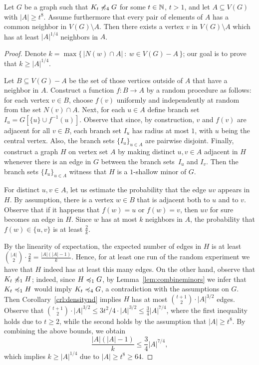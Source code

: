 \begin{lemma}\label{lem:diversity}
  Let $G$ be a graph such that $K_t\not\preccurlyeq_4G$ for some $t\in\mathbb{N}$,
  $t>1$, and let $A\subseteq V(G)$ with $|A|\geq t^{8}$.  Assume
  furthermore that every pair of elements of $A$ has a common neighbor
  in $V(G)\setminus A$.  Then there exists a vertex $v$ in
  $V(G)\setminus A$ which has at least $|A|^{1/4}$ neighbors in $A$.
\end{lemma}
\begin{proof}
  Denote $k=\max\{\,|N(w)\cap A|\ \colon\ w\in V(G)-A\,\}$; our goal
  is to prove that $k\geq |A|^{1/4}$.

  Let $B\subseteq V(G)-A$ be the set of those vertices outside of $A$
  that have a neighbor in $A$.  Construct a function $f\colon B\to A$
  by a random procedure as follows: for each vertex $v\in B$, choose
  $f(v)$ uniformly and independently at random from the set
  $N(v)\cap A$.  Next, for each $u\in A$ define branch set
  $I_u=G[\{u\}\cup f^{-1}(u)]$. Observe that since, by construction,
  $v$ and $f(v)$ are adjacent for all $v\in B$, each branch set $I_u$
  has radius at most $1$, with $u$ being the central vertex. Also, the
  branch sets $\{I_u\}_{u\in A}$ are pairwise disjoint.  Finally,
  construct a graph $H$ on vertex set $A$ by making distinct
  $u,v\in A$ adjacent in $H$ whenever there is an edge in $G$ between
  the branch sets~$I_u$ and $I_v$.  Then the branch sets
  $\{I_u\}_{u\in A}$ witness that $H$ is a $1$-shallow minor of $G$.

  For distinct $u,v\in A$, let us estimate the probability that the
  edge $uv$ appears in $H$.  By assumption, there is a vertex $w\in B$
  that is adjacent both to $u$ and to $v$. Observe that if it happens
  that $f(w)=u$ or $f(w)=v$, then $uv$ for sure becomes an edge in
  $H$.  Since $w$ has at most $k$ neighbors in $A$, the probability
  that $f(w)\in \{u,v\}$ is at least $\frac{2}{k}$.

  By the linearity of expectation, the expected number of edges in $H$
  is at least $\binom{|A|}{2}\cdot \frac{2}{k}=\frac{|A|(|A|-1)}{k}$.
  Hence, for at least one run of the random experiment we have that
  $H$ indeed has at least this many edges.  On the other hand, observe
  that $K_t\not\preccurlyeq_1 H$; indeed, since $H\preccurlyeq_1 G$, by
  Lemma~\ref{lem:combineminors} we infer that $K_t\preccurlyeq_1 H$ would
  imply $K_t\preccurlyeq_4 G$, a contradiction with the assumptions on $G$.
  Then Corollary~\ref{crl:densitynd} implies $H$ has at most
  $\binom{t+1}{2}\cdot |A|^{3/2}$ edges.  Observe that
  $\binom{t+1}{2}\cdot |A|^{3/2}\leq 3t^2/4\cdot |A|^{3/2}\leq
  \frac{3}{4}|A|^{7/4}$,
  where the first inequality holds due to $t\geq 2$, while the second
  holds by the assumption that $|A|\geq t^8$.  By combining the above
  bounds, we obtain
$$\frac{|A|(|A|-1)}{k}\leq \frac{3}{4}|A|^{7/4},$$
which implies $k\geq |A|^{1/4}$ due to $|A|\geq t^8\geq 64$.
\end{proof}

